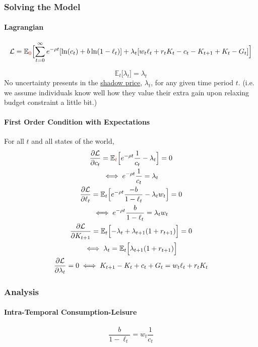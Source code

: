\documentclass[11pt]{article}
\newcommand{\expat}[2]{\mathbb{E}_{#1}\Big[{#2}\Big]}
\begin{document}
		\subsubsection{Solving the Model}
			\paragraph{Lagrangian}
			\begin{equation}
				\mc{L} = \expat{\textcolor{red}{0}}{\sum_{t=0}^\infty e^{-\rho t}[\ln(c_t) + b \ln(1-\ell_t)] + \lambda_t [w_t \ell_t + r_t K_t - c_t - K_{t+1} + K_t - G_t]}
			\end{equation}

			\begin{remark}
				\[
					\expat{t}{\lambda_t} = \lambda_t
				\]
				No uncertainty presents in the \ul{shadow price}, $\lambda_t$, for any given time period $t$. (i.e. we assume individuals know well how they value their extra gain upon relaxing budget constraint a little bit.)
			\end{remark}

			\paragraph{First Order Condition with Expectations}
			For all $t$ and all states of the world,
			\begin{gather}
				\pd{\mc{L}}{c_t} = \expat{\textcolor{red}{t}}{e^{-\rho t}\frac{1}{c_t} - \lambda_t} = 0 \\
				\iff e^{-\rho t} \frac{1}{c_t} = \lambda_t \\
				\pd{\mc{L}}{\ell_t} = \expat{t}{e^{-\rho t} \frac{-b}{1-\ell_t} - \lambda_t w_t} = 0 \\
				\iff e^{-\rho t} \frac{b}{1-\ell_t} = \lambda_t w_t \\
				\pd{\mc{L}}{K_{t+1}} = \expat{t}{-\lambda_t + \lambda_{t+1}(1 + r_{t+1})} = 0 \\
				\iff \lambda_t = \expat{t}{\lambda_{t+1}(1+r_{t+1})} \\
				\pd{\mc{L}}{\lambda_t} = 0 \iff K_{t+1} - K_t + c_t + G_t = w_t \ell_t + r_t K_t
			\end{gather}
		\subsubsection{Analysis}
			\paragraph{Intra-Temporal Consumption-Leisure}
			\begin{equation}
				\frac{b}{1-\ell_t} = w_t\frac{1}{c_t}
			\end{equation}
			
\end{document}
